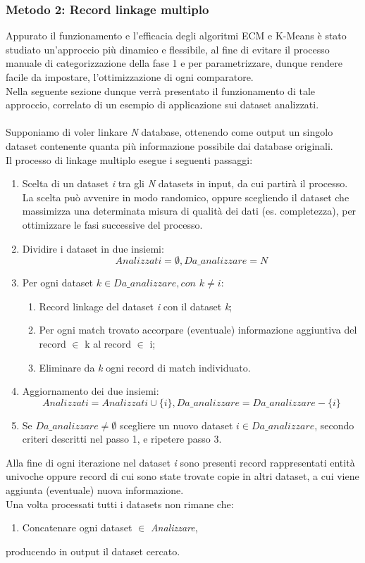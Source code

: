 \documentclass[a4paper,12pt]{article}
\begin{document}
\subsubsection{Metodo 2: Record linkage multiplo}
Appurato il funzionamento e l'efficacia degli algoritmi ECM e K-Means è stato studiato un'approccio più dinamico e flessibile, al fine di evitare il processo manuale di categorizzazione della fase 1 e per parametrizzare, dunque rendere facile da impostare, l'ottimizzazione di ogni comparatore.\\
Nella seguente sezione dunque verrà presentato il funzionamento di tale approccio, correlato di un esempio di applicazione sui dataset analizzati.\\\\
Supponiamo di voler linkare \textit{N} database, ottenendo come output un singolo dataset contenente quanta più informazione possibile dai database originali.\\
Il processo di linkage multiplo esegue i seguenti passaggi:

\begin{enumerate}
	\item Scelta di un dataset \textit{i} tra gli \textit{N} datasets in input, da cui partirà il processo. La scelta può avvenire in modo randomico, oppure scegliendo il dataset che massimizza una determinata misura di qualità dei dati (es. completezza), per ottimizzare le fasi successive del processo.
	\item Dividire i dataset in due insiemi: \[Analizzati = \emptyset, Da\_analizzare = N\]
	\item Per ogni dataset \textit{$k \in Da\_analizzare, con$ $k \neq i$}:
	\begin{enumerate}
		\item Record linkage del dataset \textit{i} con il dataset \textit{k};
		\item Per ogni match trovato accorpare (eventuale) informazione aggiuntiva del record $\in$ k al record $\in$ i;
		\item Eliminare da \textit{k} ogni record di match individuato.
	\end{enumerate}
	\item Aggiornamento dei due insiemi: \[Analizzati = Analizzati \cup \{i\}, Da\_analizzare = Da\_analizzare - \{i\}\]
	\item Se \(Da\_analizzare \neq \emptyset\) scegliere un nuovo dataset \(i \in Da\_analizzare\), secondo criteri descritti nel passo 1, e ripetere passo 3.
\end{enumerate}
Alla fine di ogni iterazione nel dataset \textit{i} sono presenti record rappresentati entità univoche oppure record di cui sono state trovate copie in altri dataset, a cui viene aggiunta (eventuale) nuova informazione.\\Una volta processati tutti i datasets non rimane che:
\begin{enumerate}[resume]
	\item Concatenare ogni dataset $\in$ \textit{Analizzare},
\end{enumerate}
producendo in output il dataset cercato.
\end{document}
